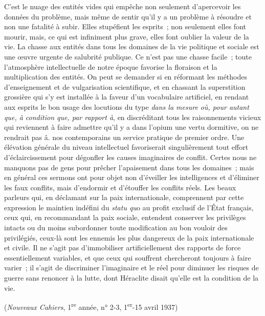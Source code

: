 \documentclass[french,twoside]{book} %
\begin{document}
\noindent C'est le nuage des entités vides qui empêche non seulement d'apercevoir les données du problème, mais même de sentir qu'il y a un problème à résoudre et non une fatalité à subir. Elles stupéfient les esprits ; non seulement elles font mourir, mais, ce qui est infiniment plus grave, elles font oublier la valeur de la vie. La chasse aux entités dans tous les domaines de la vie politique et sociale est une œuvre urgente de salubrité publique. Ce n'est pas une chasse facile ; toute l'atmosphère intellectuelle de notre époque favorise la floraison et la multiplication des entités. On peut se demander si en réformant les méthodes d'enseignement et de vulgarisation scientifique, et en chassant la superstition grossière qui s'y est installée à la faveur d'un vocabulaire artifi­ciel, en rendant aux esprits le bon usage des locutions du type {\itshape dans la mesure où, pour autant que, à condition que, par rapport à}, en discréditant tous les raisonnements vicieux qui reviennent à faire admettre qu'il y a dans l'opium une vertu dormitive, on ne rendrait pas â. nos contemporains un service prati­que de premier ordre. Une élévation générale du niveau intellectuel favorise­rait singulièrement tout effort d'éclaircissement pour dégonfler les causes imaginaires de conflit. Certes nous ne manquons pas de gens pour prêcher l'apaisement dans tous les domaines ; mais en général ces sermons ont pour objet non d'éveiller les intelligences et d'éliminer les faux conflits, mais d'endormir et d'étouffer les conflits réels. Les beaux parleurs qui, en décla­mant sur la paix internationale, comprennent par cette expression le maintien indéfini du {\itshape statu qu}o au profit exclusif de l'État français, ceux qui, en recommandant la paix sociale, entendent conserver les privilèges intacts ou du moins subordonner toute modification au bon vouloir des privilégiés, ceux-là sont les ennemis les plus dangereux de la paix internationale et civile. Il ne s'agit pas d'immobiliser artificiellement des rapports de force essentiellement variables, et que ceux qui souffrent chercheront toujours à faire varier ; il s'agit de discriminer l'imaginaire et le réel pour diminuer les risques de guerre sans renoncer à la lutte, dont Héraclite disait qu'elle est la condition de la vie.\par
({\itshape Nouveaux Cahiers}, 1\textsuperscript{re} année, n° 2-3, 1\textsuperscript{er}-15 avril 1937)\par

\begin{center}
\noindent \centerline{}
\end{center}
\end{document}
